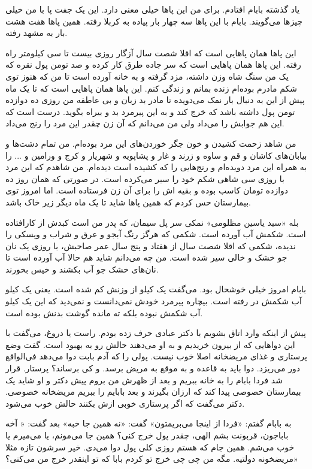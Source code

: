 \documentclass[12pt,a4paper]{book}
\begin{document}
یاد گذشته بابام افتادم. برای من این پاها خیلی معنی دارد. این یک جفت پا با من خیلی چیزها می‌گویند. بابام با این پاها سه چهار بار پیاده به کربلا رفته. همین پاها هفت هشت بار به مشهد رفته.

این پاها همان پاهایی است که اقلا شصت سال آزگار روزی بیست تا سی کیلومتر راه رفته. این پاها همان پاهایی است که سر جاده طرق کار کرده و صد تومن پول نقره که یک من سنگ شاه وزن داشته، مزد گرفته و به خانه آورده است تا من که هنوز توی شکم مادرم بوده‌ام زنده بمانم و زندگی کنم. این پاها همان پاهایی است که تا یک ماه پیش از این به دنبال بار نمک می‌دویده تا مادر بد زبان و بی عاطفه من روزی ده دوازده تومن پول داشته باشد که خرج کند و به این پیرمرد بد و بیراه بگوید. درست است که این هم جوابش را می‌داد ولی من می‌دانم که آن زن چقدر این مرد را رنج می‌داد.

من شاهد زحمت کشیدن و خون جگر خوردن‌های این مرد بوده‌ام. من تمام دشت‌ها و بیابان‌های کاشان و قم و ساوه و زرند و غار و پشاپویه و شهریار و کرج و ورامین و ... را به همراه این مرد دویده‌ام و رنج‌هایی را که کشیده است دیده‌ام. من شاهدم که این مرد با روزی سی شاهی شکم خود را سیر می‌کرده است. در صورتی که همان روز ده دوازده تومان کاسب بوده و بقیه اش را برای آن زن فرستاده است. اما امروز توی بیمارستان حس کردم که همین پاها شاید تا یک ماه دیگر زیر خاک باشد.

بله «سید یاسین مظلومی» نمکی سر پل سیمان، که پدر من است کبدش از کارافتاده است. شکمش آب آورده است. شکمی که هرگز رنگ آبجو و عرق و شراب و ویسکی را ندیده، شکمی که اقلا شصت سال از هفتاد و پنج سال عمر صاحبش، با روزی یک نان جو خشک و خالی سیر شده است. من چه می‌دانم شاید هم حالا آب آورده است تا نان‌های خشک جو آب بکشند و خیس بخورند.

بابام امروز خیلی خوشحال بود. می‌گفت یک کیلو از وزنش کم شده است. یعنی یک کیلو آب شکمش در رفته است. بیچاره پیرمرد خودش نمی‌دانست و نمی‌دید که این یک کیلو آب شکمش نبوده بلکه ته مانده گوشت بدنش بوده است.

پیش از اینکه وارد اتاق بشویم با دکتر عبادی حرف زده بودم. راست یا دروغ، می‌گفت با این دواهایی که از بیرون خریدیم و به او می‌دهند حالش رو به بهبود است. گفت وضع پرستاری و غذای مریضخانه اصلا خوب نیست. پولی را که آدم بابت دوا می‌دهد فی‌الواقع دور می‌ریزد. دوا باید به قاعده و به موقع به مریض برسد. و کی برساند؟ پرستار. قرار شد فردا بابام را به خانه ببریم و بعد از ظهرش من بروم پیش دکتر و او شاید یک بیمارستان خصوصی پیدا کند که ارزان بگیرند و بعد بابایم را ببریم مریضخانه خصوصی. دکتر می‌گفت که اگر پرستاری خوبی ازش بکنند حالش خوب می‌شود.

به بابام گفتم: «فردا از اینجا می‌بریمتون» گفت: «نه همین جا خبه» بعد گفت: « آخه باباجون، قربونت بشم الهی، چقدر پول خرج کنی؟ همین جا می‌مونم، یا می‌میرم یا خوب می‌شم. همین جام که هستم روزی کلی پول دوا می‌دی. خیر سرشون تازه مثلا مریضخونه دولتیه. مگه من چی چی خرج تو کردم بابا که تو اینقدر خرج من می‌کنی؟»
\end{document}

